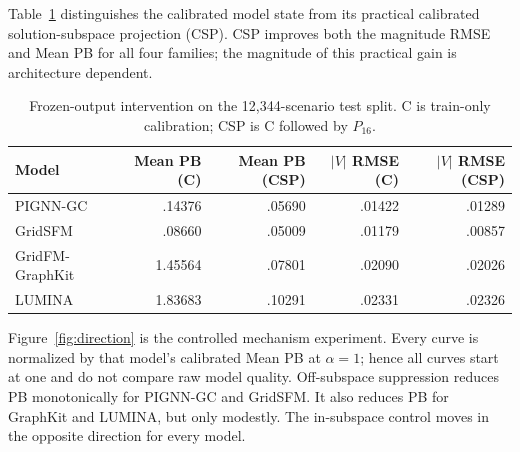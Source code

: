 \documentclass[10pt,a4paper]{article}
\newcommand{\Vm}{\lvert V\rvert}
\begin{document}
Table~\ref{tab:practical} distinguishes the calibrated model state from its
practical calibrated solution-subspace projection (CSP).  CSP improves both
the magnitude RMSE and Mean PB for all four families; the magnitude of this
practical gain is architecture dependent.

\begin{table}[H]
\centering\small
\caption{Frozen-output intervention on the 12,344-scenario test split.  C is
train-only calibration; CSP is C followed by $P_{16}$.}\label{tab:practical}
\begin{tabular}{lrrrr}
\toprule
Model & Mean PB (C) & Mean PB (CSP) & $\Vm$ RMSE (C) & $\Vm$ RMSE (CSP)\\
\midrule
PIGNN-GC & .14376 & .05690 & .01422 & .01289\\
GridSFM & .08660 & .05009 & .01179 & .00857\\
GridFM-GraphKit & 1.45564 & .07801 & .02090 & .02026\\
LUMINA & 1.83683 & .10291 & .02331 & .02326\\
\bottomrule
\end{tabular}
\end{table}

Figure~\ref{fig:direction} is the controlled mechanism experiment.  Every
curve is normalized by that model's calibrated Mean PB at $\alpha=1$; hence
all curves start at one and do not compare raw model quality.  Off-subspace
suppression reduces PB monotonically for PIGNN-GC and GridSFM.  It also reduces
PB for GraphKit and LUMINA, but only modestly.  The in-subspace control moves
in the opposite direction for every model.
\end{document}
